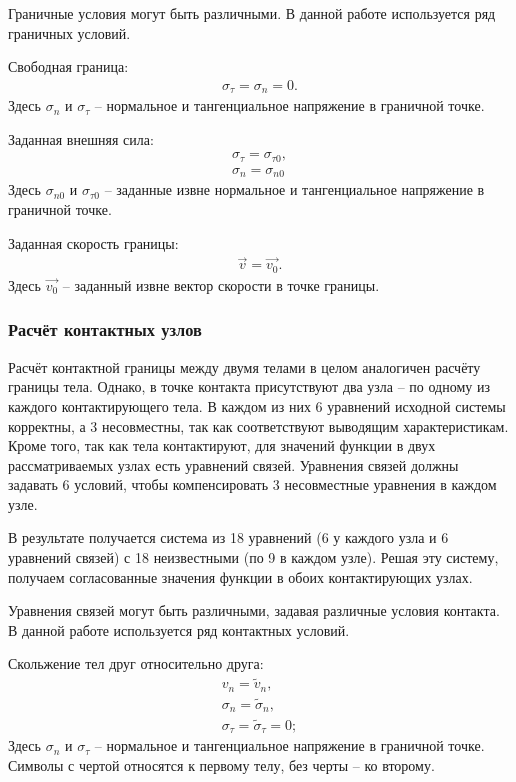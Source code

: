 Граничные условия могут быть различными. В данной работе используется ряд граничных условий.

Свободная граница:
\begin{eqnarray}
\sigma_\tau=\sigma_n=0.
\end{eqnarray}
Здесь $\sigma_n$ и $\sigma_\tau$ -- нормальное и тангенциальное напряжение в граничной точке.

Заданная внешняя сила:
\begin{eqnarray}
\sigma_\tau = \sigma_{\tau 0}, \\
\sigma_n = \sigma_{n 0}
\end{eqnarray}
Здесь $\sigma_{n 0}$ и $\sigma_{\tau 0}$ -- заданные извне нормальное и тангенциальное напряжение в граничной точке.

Заданная скорость границы:
\begin{eqnarray}
\vec{v} = \vec{v_0}.
\end{eqnarray}
Здесь $\vec{v_0}$ -- заданный извне вектор скорости в точке границы.


\subsubsection{Расчёт контактных узлов}

Расчёт контактной границы между двумя телами в целом аналогичен расчёту границы тела. Однако, в точке контакта присутствуют два узла -- по одному из каждого контактирующего тела. В каждом из них 6 уравнений исходной системы корректны, а 3 несовместны, так как соответствуют выводящим характеристикам. Кроме того, так как тела контактируют, для значений функции в двух рассматриваемых узлах есть уравнений связей. Уравнения связей должны задавать 6 условий, чтобы компенсировать 3 несовместные уравнения в каждом узле.

В результате получается система из 18 уравнений (6 у каждого узла и 6 уравнений связей) с 18 неизвестными (по 9 в каждом узле). Решая эту систему, получаем согласованные значения функции в обоих контактирующих узлах.

Уравнения связей могут быть различными, задавая различные условия контакта. В данной работе используется ряд контактных условий.

Скольжение тел друг относительно друга:
\begin{eqnarray}
v_n=\tilde{v}_n,\nonumber\\
\sigma_n=\tilde{\sigma}_n,\nonumber\\
\sigma_\tau=\tilde{\sigma}_\tau=0; \nonumber
\end{eqnarray}
Здесь $\sigma_n$ и $\sigma_\tau$ -- нормальное и тангенциальное напряжение в граничной точке. Символы с чертой относятся к первому телу, без черты -- ко второму.

